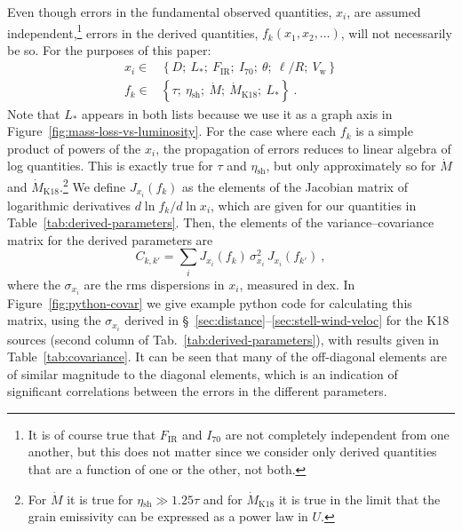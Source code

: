 \documentclass[useAMS, usenatbib, a4paper]{mnras}
\newcommand{\wind}{\ensuremath{_{\text{w}}}}
\newcommand\IR{\ensuremath{_{\text{IR}}}}
\newcommand\shell{\ensuremath{_{\text{sh}}}}
\begin{document}
Even though errors in the fundamental observed quantities, \(x_i\),
are assumed independent,\footnote{%
  It is of course true that \(F\IR\) and \(I_{70}\) are not completely
  independent from one another, but this does not matter since we
  consider only derived quantities that are a function of one or the
  other, not both.} %
errors in the derived quantities, \(f_k(x_1, x_2, \dots)\), will not
necessarily be so.  For the purposes of this paper:
\begin{align}
  \label{eq:observed-and-derived}
  x_i \in &  \left\{D;\ L_*;\ F\IR;\ I_{70};\ \theta;\ \ell/R;\ V\wind \right\} \\
  f_k \in & \left\{\tau;\ \eta\shell;\ \dot M;\ \dot M_{\text{K18}};\ L_* \right\}
            \ .
\end{align}
Note that \(L_*\) appears in both lists because we use it as a graph
axis in Figure~\ref{fig:mass-loss-vs-luminosity}.  For the case where
each \(f_k\) is a simple product of powers of the \(x_i\), the
propagation of errors reduces to linear algebra of log
quantities. This is exactly true for \(\tau\) and \(\eta\shell\), but
only approximately so for \(\dot M\) and
\(\dot M_{\text{K18}}\).\footnote{%
  For \(\dot M\) it is true for \(\eta\shell \gg 1.25 \tau\) and for
  \(\dot M_{\text{K18}}\) it is true in the limit that the grain
  emissivity can be expressed as a power law in \(U\).} %
We define \(J_{x_i} (f_k)\) as the elements of the Jacobian matrix of
logarithmic derivatives \(d \ln f_k / d \ln x_i \), which are given
for our quantities in Table~\ref{tab:derived-parameters}.  Then, the
elements of the variance--covariance matrix for the derived parameters
are
\begin{equation}
  \label{eq:covariance}
  C_{k,k'} = \sum_{i} J_{x_i} (f_k) \, \sigma_{x_i}^2 \, J_{x_i} (f_{k'}) \ , 
\end{equation}
where the \(\sigma_{x_i}\) are the rms dispersions in \(x_i\),
measured in dex.  In Figure~\ref{fig:python-covar} we give example
python code for calculating this matrix, using the \(\sigma_{x_i}\)
derived in \S~\ref{sec:distance}--\ref{sec:stell-wind-veloc} for the
K18 sources (second column of Tab.~\ref{tab:derived-parameters}), with
results given in Table~\ref{tab:covariance}.  It can be seen that many
of the off-diagonal elements are of similar magnitude to the diagonal
elements, which is an indication of significant correlations between
the errors in the different parameters.
\end{document}
